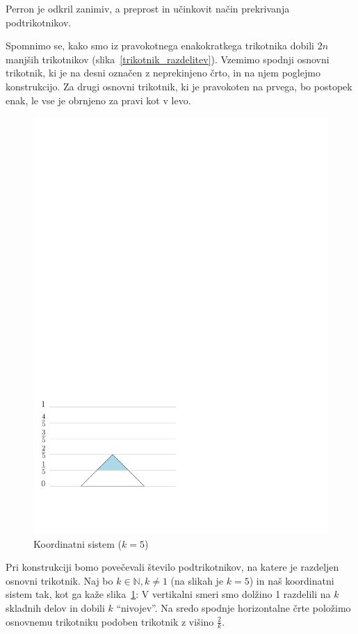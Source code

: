 \documentclass[a4paper, 12pt]{article}
\begin{document}
Perron je odkril zanimiv, a preprost in učinkovit način prekrivanja podtrikotnikov.

Spomnimo se, kako smo iz pravokotnega enakokratkega trikotnika dobili $ 2n $ manjših trikotnikov (slika~\ref{trikotnik_razdelitev}). Vzemimo spodnji osnovni trikotnik, ki je na desni označen z neprekinjeno črto, in na njem poglejmo konstrukcijo. Za drugi osnovni trikotnik, ki je pravokoten na prvega, bo postopek enak, le vse je obrnjeno za pravi kot v levo.

\begin{figure}
    \includegraphics[width=0.9\linewidth]{ipe_slike/k_5.pdf}
    \caption{Koordinatni sistem ($ k = 5 $)}
    \label{sistem5}
\end{figure}

Pri konstrukciji bomo povečevali število podtrikotnikov, na katere je razdeljen osnovni trikotnik. Naj bo $ k \in \mathbb{N}, k \neq 1 $ (na slikah je $ k = 5 $) in naš koordinatni sistem tak, kot ga kaže slika~\ref{sistem5}: V vertikalni smeri smo dolžino 1 razdelili na $ k $ skladnih delov in dobili $ k $ ``nivojev''. Na sredo spodnje horizontalne črte položimo osnovnemu trikotniku podoben trikotnik z višino $ \frac{2}{k} $.
\end{document}
